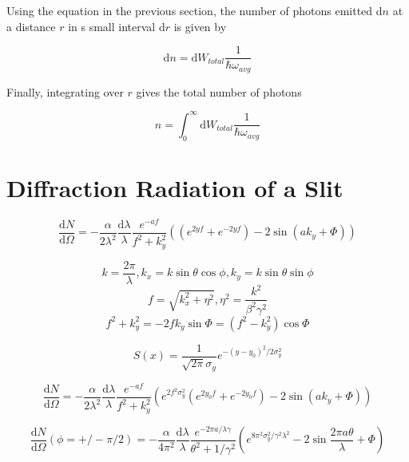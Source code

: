 \documentclass[12pt]{article}
\begin{document}
Using the equation in the previous section, the number of photons emitted d$n$ at a distance $r$ in s small interval d$r$ is given by

\begin{equation}
\mathrm{d}n=\mathrm{d} W_{total} \frac{1}{\hbar \omega_{avg}}
\end{equation}

Finally, integrating over $r$ gives the total number of photons

\begin{equation}
n=\int_0^{\infty} \mathrm{d} W_{total} \frac{1}{\hbar \omega_{avg}}
\end{equation}

\section{Diffraction Radiation of a Slit}

\begin{equation}
\frac{\mathrm{d} N}{\mathrm{d} \Omega}=-\frac{\alpha}{2\lambda^2} \frac{\mathrm{d} \lambda}{\lambda} \frac{e^{-af}}{f^2+k_{y}^{2}} ((e^{2yf}+e^{-2yf})-2 \sin (ak_y+\Phi))
\end{equation}

\begin{equation}
k=\frac{2 \pi}{\lambda},
k_x=k \sin \theta \cos \phi,
k_y=k \sin \theta \sin \phi
\end{equation}
\begin{equation}
f=\sqrt{k_{x}^{2}+\eta^2},
\eta^2=\frac{k^2}{\beta^2 \gamma^2}
\end{equation}
\begin{equation}
f^2+k_{y}^{2}=-2fk_y \sin \Phi = (f^2-k_{y}^{2}) \cos \Phi
\end{equation}

\begin{equation}
S(x)=\frac{1}{\sqrt{2 \pi} \sigma_y} e^{-(y-y_0)^2/2 \sigma_{y}^{2}}
\end{equation}

\begin{equation}
\frac{\mathrm{d} N}{\mathrm{d} \Omega}=-\frac{\alpha}{2\lambda^2} \frac{\mathrm{d} \lambda}{\lambda} \frac{e^{-af}}{f^2+k_{y}^{2}} (e^{2 f^2 \sigma_{y}^{2}}(e^{2y_0 f}+e^{-2y_0 f})-2 \sin (ak_y+\Phi))
\end{equation}

\begin{equation}
\frac{\mathrm{d} N}{\mathrm{d} \Omega}(\phi=+/- \pi/2)=-\frac{\alpha}{4 \pi^2} \frac{\mathrm{d} \lambda}{\lambda} \frac{e^{-2 \pi a/ \lambda \gamma}}{\theta^2+1/ \gamma^2} (e^{8 \pi^2 \sigma_{y}^{2}/\gamma^2 \lambda^2}-2 \sin{\frac{2 \pi a \theta}{\lambda}+\Phi})
\end{equation}
\end{document}
